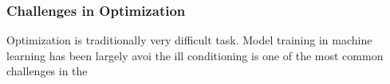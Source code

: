 \subsubsection{Challenges in Optimization}

Optimization is traditionally very difficult task. Model training in machine learning has been largely avoi
the ill conditioning is one of the most common challenges in the 